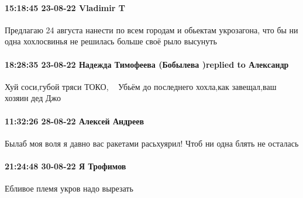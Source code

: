  
 
 
 
 

\paragraph{15:18:45 23-08-22 Vladimir T}

Предлагаю 24 августа нанести по всем городам и обьектам укрозагона, что бы ни
одна хохлосвинья не решилась больше своё рыло высунуть

\paragraph{18:28:35 23-08-22 Надежда Тимофеева (Бобылева )replied to Александр}

Хуй соси,губой тряси ТОКО,🤣🤣🤣 Убьём до последнего хохла,как завещал,ваш
хозяин дед Джо 🤪👊🏼💀💪🏻🇷🇺

\paragraph{11:32:26 28-08-22 Алексей Андреев}

Былаб моя воля я давно вас ракетами расьхуярил! Чтоб ни одна блять не осталась

\paragraph{21:24:48 30-08-22 Я Трофимов}

Ебливое племя укров надо вырезать

